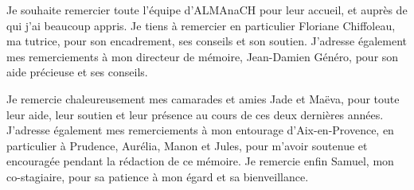 
Je souhaite remercier toute l'équipe d'ALMAnaCH pour leur accueil, et auprès de qui j'ai beaucoup appris. Je tiens à remercier en particulier Floriane Chiffoleau, ma tutrice, pour son encadrement, ses conseils et son soutien. J'adresse également mes remerciements à mon directeur de mémoire, Jean-Damien Généro, pour son aide précieuse et ses conseils.  

Je remercie chaleureusement mes camarades et amies Jade et Maëva, pour toute leur aide, leur soutien et leur présence au cours de ces deux dernières années. J'adresse également mes remerciements à mon entourage d'Aix-en-Provence, en particulier à Prudence, Aurélia, Manon et Jules, pour m'avoir soutenue et encouragée pendant la rédaction de ce mémoire. Je remercie enfin Samuel, mon co-stagiaire, pour sa patience à mon égard et sa bienveillance.